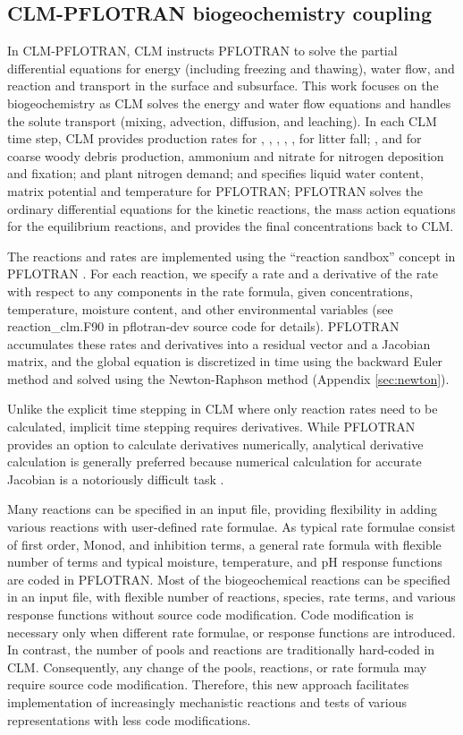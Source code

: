 \documentclass[gmd, manuscript]{copernicus}
\begin{document}
\subsection{CLM-PFLOTRAN biogeochemistry coupling}
In CLM-PFLOTRAN, CLM instructs PFLOTRAN to solve the partial differential equations for energy (including freezing and thawing), water flow, and reaction
and transport in the surface and subsurface. This work focuses on the biogeochemistry as CLM solves the energy and water flow equations and handles the solute transport (mixing, advection, diffusion, and leaching). In each CLM time step, CLM provides production rates for , , , , ,  for litter fall; , and  for coarse woody debris production, ammonium and nitrate for nitrogen deposition and fixation; and plant nitrogen demand; and specifies liquid water content, matrix potential and temperature for PFLOTRAN; PFLOTRAN solves the ordinary differential equations for the kinetic reactions, the mass action equations for the equilibrium reactions, and provides the final concentrations back to CLM.   

The reactions and rates are implemented using the ``reaction sandbox'' concept in PFLOTRAN \citep{Lichtner2015}. For each reaction, we specify a rate and a derivative of the rate with respect to any components in the rate formula, given concentrations, temperature, moisture content, and other environmental variables (see reaction\_clm.F90 in pflotran-dev source code for details). PFLOTRAN accumulates these rates and derivatives into a residual vector and a Jacobian matrix, and the global equation is discretized in time using the backward Euler method and solved using the Newton-Raphson method (Appendix \ref{sec:newton}).

Unlike the explicit time stepping in CLM where only  reaction rates need to be calculated, implicit time stepping requires derivatives.  While PFLOTRAN
provides an option to calculate derivatives numerically, analytical derivative calculation is generally preferred \citep[e.g.,][]{Xu2006} because numerical calculation for accurate Jacobian is a notoriously difficult task \citep{Shampine2005}. 

Many reactions can be specified in an input file, providing flexibility in adding various reactions with user-defined rate formulae. As typical rate formulae consist of first order, Monod, and inhibition terms, a general rate formula with flexible number of terms and typical moisture, temperature, and pH response functions are coded in PFLOTRAN. Most of the biogeochemical reactions can be specified in an input file, with flexible number of reactions, species, rate terms, and various response functions without source code modification. Code modification is necessary only when different rate formulae, or response
functions are introduced. In contrast, the number of pools and reactions are traditionally hard-coded in CLM. Consequently, any change of the pools,
reactions, or rate formula may require source code modification. Therefore, this new approach facilitates implementation of increasingly mechanistic reactions
and tests of various representations with less code modifications.
\end{document}
